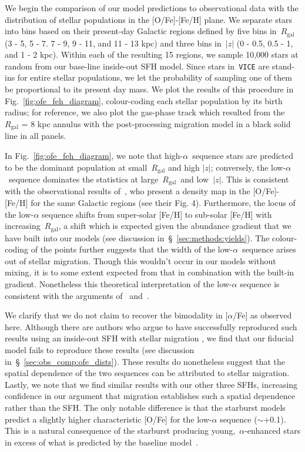 \documentclass[fleqn, usenatbib]{mnras}
\begin{document}
We begin the comparison of our model predictions to observational data with the 
distribution of stellar populations in the [O/Fe]-[Fe/H] plane. We separate 
stars into bins based on their present-day Galactic regions defined by five 
bins in~$R_\text{gal}$ (3 - 5, 5 - 7. 7 - 9, 9 - 11, and 11 - 13 kpc) and three 
bins in~$\left|z\right|$ (0 - 0.5, 0.5 - 1, and 1 - 2 kpc). Within each of the 
resulting 15 regions, we sample 10,000 stars at random from our base-line 
inside-out SFH model. Since stars in~\texttt{VICE} are stand-ins for entire 
stellar populations, we let the probability of sampling one of them be 
proportional to its present day mass. We plot the results of this procedure in 
Fig.~\ref{fig:ofe_feh_diagram}, colour-coding each stellar population by its 
birth radius; for reference, we also plot the gas-phase track which resulted 
from the~$R_\text{gal}$ = 8 kpc annulus with the post-processing migration 
model in a black solid line in all panels. 
\par 
In Fig.~\ref{fig:ofe_feh_diagram}, we note that high-$\alpha$~sequence stars 
are predicted to be the dominant population at small~$R_\text{gal}$ and high 
$\left|z\right|$; conversely, the low-$\alpha$~sequence dominates the 
statistics at large~$R_\text{gal}$~and low~$\left|z\right|$. This is consistent 
with the observational results of~\citet{Hayden2015}, who present a density map 
in the [O/Fe]-[Fe/H] for the same Galactic regions (see their Fig. 4). 
Furthermore, the locus of the low-$\alpha$ sequence shifts from super-solar 
[Fe/H] to sub-solar [Fe/H] with increasing~$R_\text{gal}$, a shift which is 
expected given the abundance gradient that we have built into our models (see 
discussion in~\S~\ref{sec:methods:yields}). The colour-coding of the points 
further suggests that the width of the low-$\alpha$~sequence arises out of 
stellar migration. Though this wouldn't occur in our models without mixing, it 
is to some extent expected from that in combination with the built-in gradient. 
Nonetheless this theoretical interpretation of the low-$\alpha$ sequence is 
consistent with the arguments of~\citet{Schoenrich2009} and~\citet{Nidever2014}. 
\par 
We clarify that we do not claim to recover the bimodality in [$\alpha$/Fe] as 
observed here. Although there are authors who argue to have successfully 
reproduced such results using an inside-out SFH with stellar migration 
\citep[e.g.][]{Sharma2020}, we find that our fiducial model fails to reproduce 
these results (see discussion in~\S~\ref{sec:obs_comp:ofe_dists}). These 
results do nonetheless suggest that the spatial dependence of the two sequences 
can be attributed to stellar migration. Lastly, we note that we find similar 
results with our other three SFHs, increasing confidence in our argument that 
migration establishes such a spatial dependence rather than the SFH. The only 
notable difference is that the starburst models predict a slightly higher 
characteristic [O/Fe] for the low-$\alpha$ sequence ($\sim$+0.1). This is a 
natural consequence of the starburst producing young,~$\alpha$-enhanced stars 
in excess of what is predicted by the baseline model~\citep{Johnson2020}. 
\end{document}
